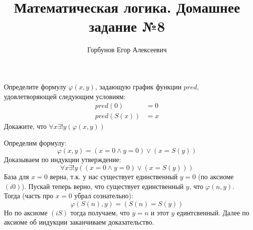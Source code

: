 


\title{Математическая логика. Домашнее задание №8}
\author{Горбунов Егор Алексеевич}


\maketitle

\begin{task}[1]
	Определите формулу $\varphi(x,y)$, задающую график функции $pred$, удовлетворяющей следующим условиям:
	\begin{align*}
		pred(0) & = 0 \\
		pred(S(x)) & = x
	\end{align*}
	Докажите, что $\forall x \exists! y (\varphi(x,y))$
\end{task}
\begin{solution}
	Определим формулу:
	\[
		\varphi(x, y) = (x = 0 \land y = 0) \lor (x = S(y))
	\]
	Доказываем по индукции утверждение:
	\[
		\forall x \exists! y ((x = 0 \land y = 0) \lor (x = S(y)))
	\]
	База для $x = 0$ верна, т.к. у нас существует единственный $y = 0$ (по аксиоме $(i0)$). Пускай теперь верно, что существует единственный $y$, что $\varphi(n, y)$. Тогда (часть про $x = 0$ убрал сознательно):
	\[
		\varphi(S(n), y) = (S(n) = S(y))
	\]
	Но по аксиоме $(iS)$ тогда получаем, что $y = n$ и этот $y$ единтсвенный. Далее по аксиоме об индукции заканчиваем доказательство. \xqed
\end{solution}

